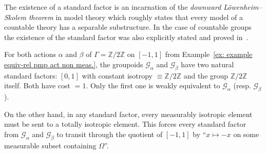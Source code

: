 \documentclass[AHL,Unicode,longabstracts,published]{cedram}
\newcommand{\Zmath}{\mathbb{Z}}
\newcommand{\cg}{\mathcal{G}}
\begin{document}
The existence of a standard factor is an incarnation of the \emph{downward L\"owenheim--Skolem theorem} in model theory which roughly states that every model of a countable theory has a separable substructure. In the case of countable groups the existence of the standard factor was also explicitly stated and proved in~\cite{Card-ultra-prod-we-sofic-arxiv}.

\begin{exam}
For both actions $\alpha$ and $\beta$ of $\Gamma=\Zmath/2\Zmath$ on $[-1,1]$ from Example~\ref{ex: example equiv-rel pmp act non meas.}, the groupoids $\cg_{\alpha}$ and $\cg_{\beta}$ have two natural standard factors: $[0,1]$ with constant isotropy $\equiv \Zmath/2\Zmath$ and the group $ \Zmath/2\Zmath$ itself. Both have cost $=1$. Only the first one is weakly equivalent to $\cg_{\alpha}$ (resp. $\cg_{\beta}$).

On the other hand, in any standard factor, every measurably isotropic element must be sent to a totally isotropic element. This forces every standard factor from $\cg_{\alpha}$ and $\cg_{\beta}$ to transit through the quotient of $[-1,1]$ by ``$x\mapsto -x$ on some measurable subset containing $\Omega$''.
\end{exam}
\end{document}
